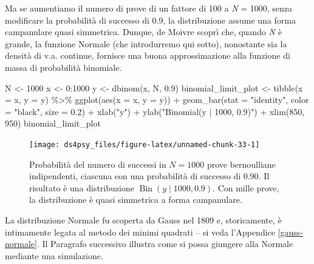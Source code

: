 \documentclass[
  11pt,
]{krantz}
\makeatletter
\newenvironment{Shaded}{\begin{snugshade}}{\end{snugshade}}
\newcommand{\AttributeTok}[1]{\textcolor[rgb]{0.61,0.61,0.61}{#1}}
\newcommand{\DecValTok}[1]{\textcolor[rgb]{0.06,0.06,0.06}{#1}}
\newcommand{\FloatTok}[1]{\textcolor[rgb]{0.06,0.06,0.06}{#1}}
\newcommand{\FunctionTok}[1]{\textcolor[rgb]{0,0,0}{#1}}
\newcommand{\NormalTok}[1]{#1}
\newcommand{\OtherTok}[1]{\textcolor[rgb]{0.37,0.37,0.37}{#1}}
\newcommand{\SpecialCharTok}[1]{\textcolor[rgb]{0,0,0}{#1}}
\newcommand{\StringTok}[1]{\textcolor[rgb]{0.5,0.5,0.5}{#1}}
\newenvironment{kframe}{%
\medskip{}
\setlength{\fboxsep}{.8em}
 \def\at@end@of@kframe{}%
 \ifinner\ifhmode%
  \def\at@end@of@kframe{\end{minipage}}%
  \begin{minipage}{\columnwidth}%
 \fi\fi%
 \def\FrameCommand##1{\hskip\@totalleftmargin \hskip-\fboxsep
 \colorbox{shadecolor}{##1}\hskip-\fboxsep
     \hskip-\linewidth \hskip-\@totalleftmargin \hskip\columnwidth}%
 \MakeFramed {\advance\hsize-\width
   \@totalleftmargin\z@ \linewidth\hsize
   \@setminipage}}%
 {\par\unskip\endMakeFramed%
 \at@end@of@kframe}
\renewenvironment{Shaded}{\begin{kframe}}{\end{kframe}}
\DeclareMathOperator{\Bin}{Bin} %
\theoremstyle{definition}
\theoremstyle{definition}
\theoremstyle{definition}
\theoremstyle{definition}
\theoremstyle{remark}
\makeatother
\begin{document}
Ma se aumentiamo il numero di prove di un fattore di 100 a \emph{N} = 1000, senza modificare la probabilità di successo di 0.9, la distribuzione assume una forma campanulare quasi simmetrica. Dunque, de Moivre scoprì che, quando \emph{N} è grande, la funzione Normale (che introdurremo qui sotto), nonostante sia la densità di v.a. continue, fornisce una buona approssimazione alla funzione di massa di probabilità binomiale.

\begin{Shaded}
\begin{Highlighting}[]
\NormalTok{N }\OtherTok{\textless{}{-}} \DecValTok{1000}
\NormalTok{x }\OtherTok{\textless{}{-}} \DecValTok{0}\SpecialCharTok{:}\DecValTok{1000}
\NormalTok{y }\OtherTok{\textless{}{-}} \FunctionTok{dbinom}\NormalTok{(x, N, }\FloatTok{0.9}\NormalTok{)}
\NormalTok{binomial\_limit\_plot }\OtherTok{\textless{}{-}}
  \FunctionTok{tibble}\NormalTok{(}\AttributeTok{x =}\NormalTok{ x, }\AttributeTok{y =}\NormalTok{ y) }\SpecialCharTok{\%\textgreater{}\%}
  \FunctionTok{ggplot}\NormalTok{(}\FunctionTok{aes}\NormalTok{(}\AttributeTok{x =}\NormalTok{ x, }\AttributeTok{y =}\NormalTok{ y)) }\SpecialCharTok{+}
  \FunctionTok{geom\_bar}\NormalTok{(}\AttributeTok{stat =} \StringTok{"identity"}\NormalTok{, }\AttributeTok{color =} \StringTok{"black"}\NormalTok{, }\AttributeTok{size =} \FloatTok{0.2}\NormalTok{) }\SpecialCharTok{+}
  \FunctionTok{xlab}\NormalTok{(}\StringTok{"y"}\NormalTok{) }\SpecialCharTok{+}
  \FunctionTok{ylab}\NormalTok{(}\StringTok{"Binomial(y | 1000, 0.9)"}\NormalTok{) }\SpecialCharTok{+}
  \FunctionTok{xlim}\NormalTok{(}\DecValTok{850}\NormalTok{, }\DecValTok{950}\NormalTok{)}
\NormalTok{binomial\_limit\_plot}
\end{Highlighting}
\end{Shaded}

\begin{figure}[h]

{\centering \texttt{[image: ds4psy\_files/figure-latex/unnamed-chunk-33-1]} 

}

\caption{Probabilità del numero di successi in $N = 1000$ prove bernoulliane indipendenti, ciascuna con una probabilità di successo di 0.90. Il risultato è una distribuzione $\Bin(y \mid 1000, 0.9)$. Con mille prove, la distribuzione è quasi simmetrica a forma campanulare.}\label{fig:unnamed-chunk-33}
\end{figure}

La distribuzione Normale fu scoperta da Gauss nel 1809 e, storicamente, è intimamente legata al metodo dei minimi quadrati -- si veda l'Appendice \ref{gauss-normale}. Il Paragrafo successivo illustra come si possa giungere alla Normale mediante una simulazione.
\end{document}
